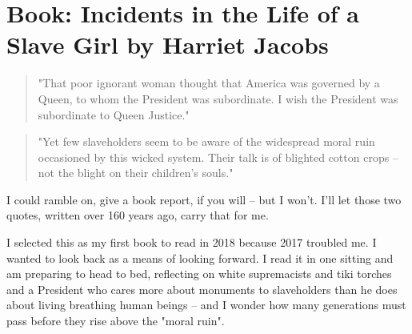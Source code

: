 \onecolumn
\chapter{Book: Incidents in the Life of a Slave Girl by Harriet Jacobs}

\begin{quote}
"That poor ignorant woman thought that America was governed by a Queen, to whom the President was subordinate. I wish the President was subordinate to Queen Justice."
\end{quote}

\begin{quote}
"Yet few slaveholders seem to be aware of the widespread moral ruin occasioned by this wicked system. Their talk is of blighted cotton crops -- not the blight on their children's souls."
\end{quote}

\hline

I could ramble on, give a book report, if you will -- but I won't. I'll let those two quotes, written over 160 years ago, carry that for me.

I selected this as my first book to read in 2018 because 2017 troubled me. I wanted to look back as a means of looking forward. I read it in one sitting and am preparing to head to bed, reflecting on white supremacists and tiki torches and a President who cares more about monuments to slaveholders than he does about living breathing human beings -- and I wonder how many generations must pass before they rise above the "moral ruin".